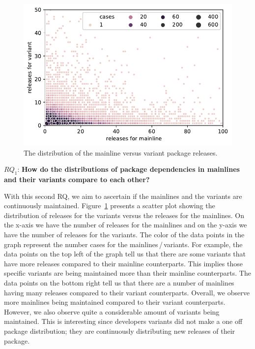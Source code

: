 \begin{figure}[htbp]
\vspace{-.3cm}
   \centering
    \includegraphics[scale=0.6]{figures/benevolj_releases.pdf}
    \caption{The distribution of the mainline versus variant package releases.}
    \label{fig:releases}
\end{figure}


$RQ_1$: \textbf{How do the distributions of package dependencies in mainlines and their variants compare to each other?}

With this second RQ, we aim to ascertain if the mainlines and the variants are continuously maintained. 
Figure~\ref{fig:releases} presents a scatter plot showing the distribution of releases for the variants versus the releases for the mainlines. 
On the x-axis we have the number of releases for the mainlines and on the y-axis we have the number of releases for the variants. 
The color of the data points in the graph represent the number cases for the mainlines\,/\,variants. 
For example, the data points on the top left of the graph tell us that there are some variants that have more releases compared to their mainline counterparts. 
This implies those specific variants are being maintained more than their mainline counterparts.
The data points on the bottom right tell us that there are a number of mainlines having many releases compared to their variant counterparts. 
Overall, we observe more mainlines being maintained compared to their variant counterparts.
However, we also observe quite a considerable amount of variants being maintained. 
This is interesting since developers variants did not make a one off package distribution; they are continuously distributing new releases of their package. 

